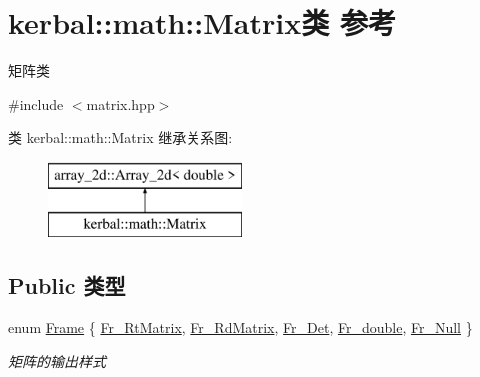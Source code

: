 \hypertarget{classkerbal_1_1math_1_1_matrix}{}\section{kerbal\+:\+:math\+:\+:Matrix类 参考}
\label{classkerbal_1_1math_1_1_matrix}


矩阵类  




{\ttfamily \#include $<$matrix.\+hpp$>$}

类 kerbal\+:\+:math\+:\+:Matrix 继承关系图\+:\begin{figure}[H]
\begin{center}
\leavevmode
\includegraphics[height=2.000000cm]{classkerbal_1_1math_1_1_matrix}
\end{center}
\end{figure}
\subsection*{Public 类型}
\begin{DoxyCompactItemize}
\item 
enum \hyperlink{classkerbal_1_1math_1_1_matrix_a00dd9ef9c8b8c06f50eed7681f147f71}{Frame} \{ \newline
\hyperlink{classkerbal_1_1math_1_1_matrix_a00dd9ef9c8b8c06f50eed7681f147f71a2ef25fdcf6ef827bf880416bbccb0122}{Fr\+\_\+\+Rt\+Matrix}, 
\hyperlink{classkerbal_1_1math_1_1_matrix_a00dd9ef9c8b8c06f50eed7681f147f71a0589c43464f4819e8208963d92b6c664}{Fr\+\_\+\+Rd\+Matrix}, 
\hyperlink{classkerbal_1_1math_1_1_matrix_a00dd9ef9c8b8c06f50eed7681f147f71aa0277b6e31fe0cf44b854581700e6edb}{Fr\+\_\+\+Det}, 
\hyperlink{classkerbal_1_1math_1_1_matrix_a00dd9ef9c8b8c06f50eed7681f147f71a3b38ac99caab77f29eed02c314db27bf}{Fr\+\_\+double}, 
\newline
\hyperlink{classkerbal_1_1math_1_1_matrix_a00dd9ef9c8b8c06f50eed7681f147f71a57572d7e73fbd562375f1851ba6c31e9}{Fr\+\_\+\+Null}
 \}\begin{DoxyCompactList}\small\item\em 矩阵的输出样式 \end{DoxyCompactList}
\end{DoxyCompactItemize}
